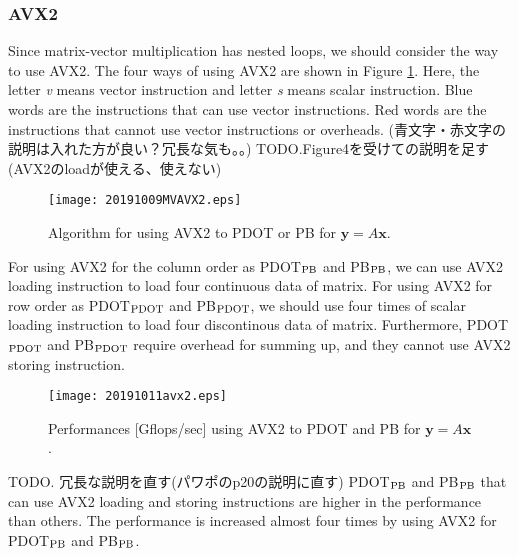 \documentclass{IOS-Book-Article}
\begin{document}
\subsubsection{AVX2}
Since matrix-vector multiplication has nested loops, we should consider the way to use AVX2. 
The four ways of using AVX2 are shown in Figure \ref{figimpAVX}. 
Here, the letter {\it v} means vector instruction and letter {\it s} means scalar instruction. 
Blue words are the instructions that can use vector instructions. 
Red words are the instructions that cannot use vector instructions or overheads.
(青文字・赤文字の説明は入れた方が良い？冗長な気も。。)
TODO.Figure4を受けての説明を足す(AVX2のloadが使える、使えない)
\begin{figure}[htbp]
  \begin{center}
    \texttt{[image: 20191009MVAVX2.eps]}
    \caption{Algorithm for using AVX2 to PDOT or PB for $\bm{y} = A\bm{x}$.}
    \label{figimpAVX}
  \end{center}
\end{figure}

For using AVX2 for the column order as PDOT$_{\rm{PB}}$ and PB$_{\rm{PB}}$, we can use AVX2 loading instruction to load four continuous data of matrix.
For using AVX2 for row order as PDOT$_{\rm{PDOT}}$ and PB$_{\rm{PDOT}}$, we should use four times of scalar loading instruction to load four discontinous data of matrix.
Furthermore, PDOT$_{\rm{PDOT}}$ and PB$_{\rm{PDOT}}$ require overhead for summing up, and they cannot use AVX2 storing instruction.

\begin{figure}[htbp]
  \begin{center}
    \texttt{[image: 20191011avx2.eps]}
    \caption{Performances [Gflops/sec] using AVX2 to PDOT and PB for $\bm{y} = A\bm{x}$.}
    \label{figMV}
  \end{center}
\end{figure}

TODO. 冗長な説明を直す(パワポのp20の説明に直す)
PDOT$_{\rm{PB}}$ and PB$_{\rm{PB}}$ that can use AVX2 loading and storing instructions are higher in the performance than others.
The performance is increased almost four times by using AVX2 for PDOT$_{\rm{PB}}$ and PB$_{\rm{PB}}$. 
\end{document}
